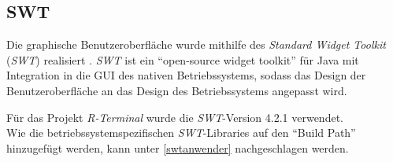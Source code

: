 \documentclass[a4paper, 12pt]{report} %
\begin{document}
\subsection{SWT}\label{swt} 
Die graphische Benutzeroberfläche wurde mithilfe des \textit{Standard Widget Toolkit} (\textit{SWT}) realisiert \cite{swt}. \textit{SWT} ist ein "`open-source widget toolkit"' für Java mit Integration in die GUI des nativen Betriebssystems, sodass das Design der Benutzeroberfläche an das Design des Betriebssystems angepasst wird. 

Für das Projekt \textit{R-Terminal} wurde die \textit{SWT}-Version 4.2.1 verwendet.\\

Wie die betriebssystemspezifischen \textit{SWT}-Libraries auf den "`Build Path"' hinzugefügt werden, kann unter \ref{swtanwender} nachgeschlagen werden.





%
\end{document}
